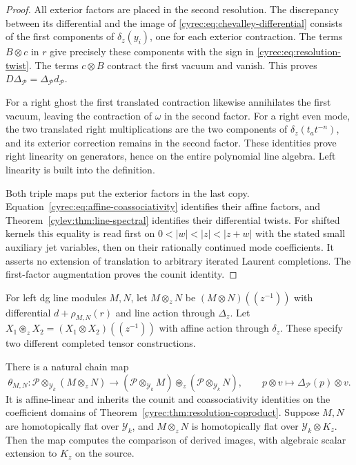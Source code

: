 \begin{proof}
All exterior factors are placed in the second resolution.
The discrepancy between its differential and the image of
\eqref{cyrec:eq:chevalley-differential} consists of the first
components of $\delta_z(y_i)$, one for each exterior contraction.
The terms $B\otimes c$ in $r$ give precisely these components
with the sign in \eqref{cyrec:eq:resolution-twist}. The terms
$c\otimes B$ contract the first vacuum and vanish. This proves
$D\Delta_{\mathcal P}=\Delta_{\mathcal P}d_{\mathcal P}$.

For a right ghost the first translated contraction likewise
annihilates the first vacuum, leaving the contraction of $\omega$
in the second factor. For a right even mode, the two translated
right multiplications are the two components of
$\delta_z(t_at^{-n})$, and its exterior correction remains in
the second factor. These identities prove right linearity on
generators, hence on the entire polynomial line algebra.
Left linearity is built into the definition.

Both triple maps put the exterior factors in the last copy.
Equation~\eqref{cyrec:eq:affine-coassociativity} identifies their
affine factors, and Theorem~\ref{cylev:thm:line-spectral}
identifies their differential twists.
For shifted kernels this equality is read first on
$0<|w|<|z|<|z+w|$ with the stated small auxiliary jet variables,
then on their rationally continued mode coefficients.
It asserts no extension of translation to arbitrary iterated
Laurent completions. The first-factor augmentation proves the
counit identity.
\end{proof}

For left dg line modules $M,N$, let $M\otimes_zN$ be
$(M\otimes N)((z^{-1}))$ with differential $d+\rho_{M,N}(r)$
and line action through $\Delta_z$. Let
$X_1\circledast_zX_2=(X_1\otimes X_2)((z^{-1}))$ with affine
action through $\delta_z$. These specify two different
completed tensor constructions.

\begin{corollary}\label{cyrec:cor:tensorator}
There is a natural chain map
\begin{equation}\label{cyrec:eq:tensorator}
 \theta_{M,N}:\mathcal P\otimes_{\mathcal Y_k}(M\otimes_zN)
 \longrightarrow
 (\mathcal P\otimes_{\mathcal Y_k}M)
          \circledast_z(\mathcal P\otimes_{\mathcal Y_k}N),
 \qquad p\otimes v\longmapsto\Delta_{\mathcal P}(p)\otimes v.
\end{equation}
It is affine-linear and inherits the counit and coassociativity
identities on the coefficient domains of
Theorem~\ref{cyrec:thm:resolution-coproduct}.
Suppose $M,N$ are homotopically flat over $\mathcal Y_k$, and
$M\otimes_zN$ is homotopically flat over $\mathcal Y_k\otimes K_z$.
Then the map computes the comparison of derived images, with
algebraic scalar extension to $K_z$ on the source.
\end{corollary}

